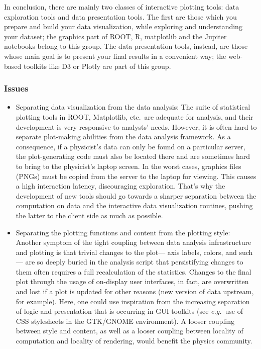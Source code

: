 \documentclass[12pt,a4paper]{article}
\begin{document}
In conclusion, there are mainly two classes of interactive plotting tools: data exploration tools and data presentation tools.
The first are those which you prepare and build your data visualization, while exploring and understanding your dataset;
the graphics part of ROOT, R, matplotlib and the Jupiter notebooks belong to this group. The data presentation tools, instead,
are those whose main goal is to present your final results in a convenient way; the web-based toolkits like D3 or Plotly
are part of this group.

\hypertarget{stats-issues}{%
\subsubsection{Issues}\label{stats-issues}}

\begin{itemize}
\item Separating data visualization from the data analysis:
The suite of statistical plotting tools in ROOT, Matplotlib, etc.\ are adequate for analysis, and their development is
very responsive to analysts’ needs. However, it is often hard to separate plot-making abilities from the data analysis framework.
As a consequence, if a physicist’s data can only be found on a particular server, the plot-generating code must also be located
there and are sometimes hard to bring to the physicist’s laptop screen. In the worst cases, graphics files (PNGs) must be copied
from the server to the laptop for viewing. This causes a high interaction latency, discouraging exploration. That’s why the
development of new tools should go towards a sharper separation between the computation on data and the interactive data visualization
routines, pushing the latter to the client side as much as possible.

\item Separating the plotting functions and content from the plotting style:
Another symptom of the tight coupling between data analysis infrastructure and plotting is that trivial changes to the plot— axis labels,
colors, and such— are so deeply buried in the analysis script that persistifying changes to them often requires a full recalculation
of the statistics. Changes to the final plot through the usage of on-display user interfaces, in fact, are overwritten and lost if a
plot is updated for other reasons (new version of data upstream, for example). Here, one could use inspiration from the increasing
separation of logic and presentation that is occurring in GUI toolkits (see {\it e.g.}\ use of CSS stylesheets in the GTK/GNOME environment).
A looser coupling between style and content, as well as a looser coupling between locality of computation and locality of rendering,
would benefit the physics community.
\end{itemize}
\end{document}
